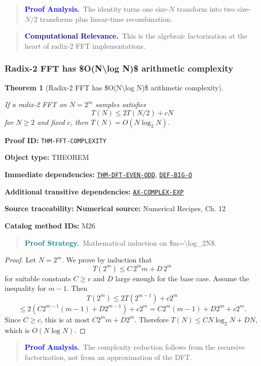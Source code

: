 \documentclass[10pt]{article}
\newcommand{\pidraw}[1]{\begingroup\urlstyle{tt}\nolinkurl{#1}\endgroup}
\newcommand{\pidref}[1]{\hyperref[prf:#1]{\pidraw{#1}}}
\newtheorem{theorem}{Theorem}[section]
\theoremstyle{definition}
\theoremstyle{remark}
\newenvironment{proofstrategy}
{\begin{quote}\small\noindent\textbf{\textcolor{teal}{Proof Strategy.}}\ }
{\end{quote}}
\newenvironment{proofanalysis}
{\begin{quote}\small\noindent\textbf{\textcolor{blue}{Proof Analysis.}}\ }
{\end{quote}}
\newenvironment{computationalrelevance}
{\begin{quote}\small\noindent\textbf{\textcolor{navy}{Computational Relevance.}}\ }
{\end{quote}}
\newcommand{\meta}[2]{\noindent\textbf{#1:} #2\par}
\begin{document}
\begin{proofanalysis}The identity turns one size-$N$ transform into two size-$N/2$ transforms plus linear-time recombination.\end{proofanalysis}

\begin{computationalrelevance}This is the algebraic factorization at the heart of radix-2 FFT implementations.\end{computationalrelevance}

\subsubsection{Radix-2 FFT has \$O(N\textbackslash{}log N)\$ arithmetic complexity}

\begin{theorem}[Radix-2 FFT has \$O(N\textbackslash{}log N)\$ arithmetic complexity]\label{prf:THM-FFT-COMPLEXITY}

If a radix-2 FFT on $N=2^m$ samples satisfies
\[
T(N)\le 2T(N/2)+cN
\]
for $N\ge2$ and fixed $c$, then $T(N)=O(N\log_2N)$.

\end{theorem}

\meta{Proof ID}{\pidraw{THM-FFT-COMPLEXITY}}
\meta{Object type}{THEOREM}
\meta{Immediate dependencies}{\pidref{THM-DFT-EVEN-ODD}, \pidref{DEF-BIG-O}}
\meta{Additional transitive dependencies}{\pidref{AX-COMPLEX-EXP}}
\meta{Source traceability}{\textbf{Numerical source:} Numerical Recipes, Ch. 12}
\meta{Catalog method IDs}{M26}

\begin{proofstrategy}Mathematical induction on \$m=\textbackslash{}log\_2N\$.\end{proofstrategy}

\begin{proof}

Let $N=2^m$. We prove by induction that
\[
T(2^m)\le C\,2^m m+D\,2^m
\]
for suitable constants $C\ge c$ and $D$ large enough for the base case.
Assume the inequality for $m-1$. Then
\[
T(2^m)
\le
2T(2^{m-1})+c2^m
\]
\[
\le
2\left(C2^{m-1}(m-1)+D2^{m-1}\right)+c2^m
=
C2^m(m-1)+D2^m+c2^m.
\]
Since $C\ge c$, this is at most
$C2^m m+D2^m$. Therefore
$T(N)\le CN\log_2N+DN$, which is $O(N\log N)$.

\end{proof}

\begin{proofanalysis}The complexity reduction follows from the recursive factorization, not from an approximation of the DFT.\end{proofanalysis}
\end{document}
